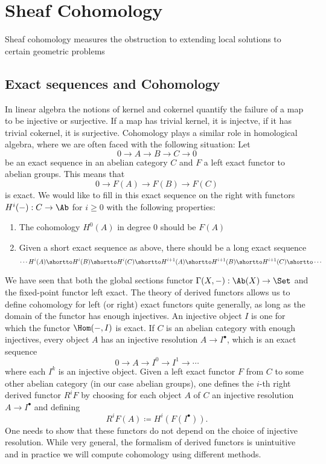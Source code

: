 \section{Sheaf Cohomology}
Sheaf cohomology measures the obstruction to extending local solutions to certain geometric problems

\subsection{Exact sequences and Cohomology}

In linear algebra the notions of kernel and cokernel quantify the failure of a map to be injective or surjective. If a map has trivial kernel, it is injectve, if it has trivial cokernel, it is surjective. Cohomology plays a similar role in homological algebra, where we are often faced with the following situation:
Let
\[
	0 \to A \to B \to C \to 0
\]
be an exact sequence in an abelian category $C$ and $F$ a left exact functor to abelian groups. This means that
\[
	0 \to F(A) \to F(B) \to F(C)
\]
is exact. We  would like to fill in this exact sequence on the right with functors $H^i(-): C \to \Ab$ for $i \ge 0$ with the following properties:
\begin{enumerate}
	\item The cohomology $H^0(A)$ in degree 0 should be $F(A)$
	\item Given a short exact sequence as above, there should be a long exact sequence
	      \[
		      \cdots H^i(A) \shortto H^i(B) \shortto H^i(C) \shortto H^{i+1}(A) \shortto H^{i+1}(B) \shortto H^{i+1}(C) \shortto \cdots
	      \]
\end{enumerate}

We have seen that both the global sections functor $\Gamma(X,-): \Ab(X) \to \Set$ and the fixed-point functor left exact. The theory of derived functors allows us to define cohomology for left (or right) exact functors quite generally, as long as the domain of the functor has enough injectives. An injective object $I$ is one for which the functor $\Hom(-,I)$ is exact. If $C$ is an abelian category with enough injectives, every object $A$ has an injective resolution $A \to I^\bullet$, which is an exact sequence
\[
	0 \to A \to I^0 \to I^1 \to \cdots
\]
where each $I^k$ is an injective object. Given a left exact functor $F$ from $C$ to some other abelian category (in our case abelian groups), one defines the $i$-th right derived functor $R^i F$ by choosing for each object $A$ of $C$ an injective resolution $A \to I^\bullet$ and defining
\[
	R^i F(A) \coloneqq H^i(F(I^\bullet)).
\]
One needs to show that these functors do not depend on the choice of injective resolution. While very general, the formalism of derived functors is unintuitive and in practice we will compute cohomology using different methods.

